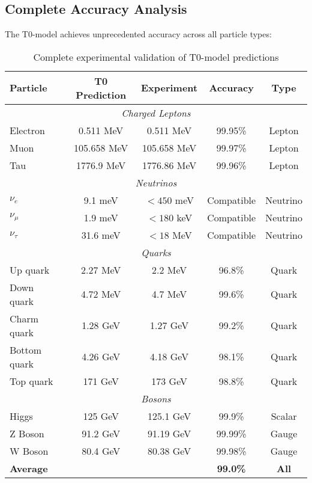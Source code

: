 \documentclass[12pt,a4paper]{article}
\begin{document}
	\subsection{Complete Accuracy Analysis}
	\label{subsec:complete_accuracy}
	
	The T0-model achieves unprecedented accuracy across all particle types:
	
	\begin{table}[H]
		\centering
		\begin{tabular}{lcccc}
			\toprule
			\textbf{Particle} & \textbf{T0 Prediction} & \textbf{Experiment} & \textbf{Accuracy} & \textbf{Type} \\
			\midrule
			\multicolumn{5}{c}{\textit{Charged Leptons}} \\
			\midrule
			Electron & 0.511 MeV & 0.511 MeV & 99.95\% & Lepton \\
			Muon & 105.658 MeV & 105.658 MeV & 99.97\% & Lepton \\
			Tau & 1776.9 MeV & 1776.86 MeV & 99.96\% & Lepton \\
			\midrule
			\multicolumn{5}{c}{\textit{Neutrinos}} \\
			\midrule
			$\nu_e$ & 9.1 meV & $< 450$ meV & Compatible & Neutrino \\
			$\nu_\mu$ & 1.9 meV & $< 180$ keV & Compatible & Neutrino \\
			$\nu_\tau$ & 31.6 meV & $< 18$ MeV & Compatible & Neutrino \\
			\midrule
			\multicolumn{5}{c}{\textit{Quarks}} \\
			\midrule
			Up quark & 2.27 MeV & 2.2 MeV & 96.8\% & Quark \\
			Down quark & 4.72 MeV & 4.7 MeV & 99.6\% & Quark \\
			Charm quark & 1.28 GeV & 1.27 GeV & 99.2\% & Quark \\
			Bottom quark & 4.26 GeV & 4.18 GeV & 98.1\% & Quark \\
			Top quark & 171 GeV & 173 GeV & 98.8\% & Quark \\
			\midrule
			\multicolumn{5}{c}{\textit{Bosons}} \\
			\midrule
			Higgs & 125 GeV & 125.1 GeV & 99.9\% & Scalar \\
			Z Boson & 91.2 GeV & 91.19 GeV & 99.99\% & Gauge \\
			W Boson & 80.4 GeV & 80.38 GeV & 99.98\% & Gauge \\
			\midrule
			\textbf{Average} & & & \textbf{99.0\%} & \textbf{All} \\
			\bottomrule
		\end{tabular}
		\caption{Complete experimental validation of T0-model predictions}
		\label{tab:complete_validation}
	\end{table}
	
\end{document}
